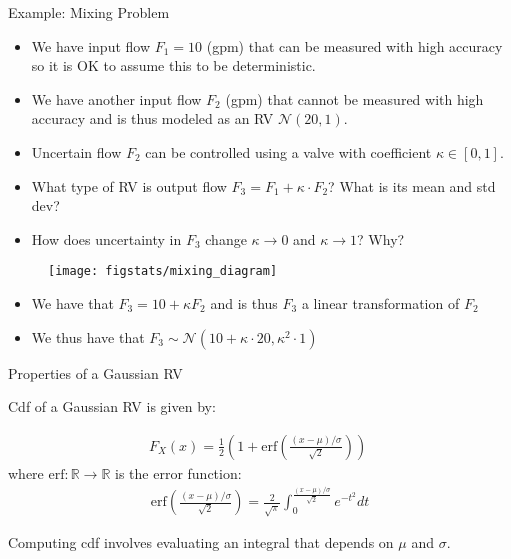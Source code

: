 \documentclass[handout,9pt]{beamer}
\begin{document}
\begin{frame}{Example: Mixing Problem}
\begin{itemize}
\item We have input flow  $F_1=10$ (gpm) that can be measured with high accuracy so it is OK to assume this to be deterministic. 
\item We have another input flow $F_2$ (gpm) that cannot be measured with high accuracy and is thus modeled as an RV $\mathcal{N}(20,1)$. 
\item Uncertain flow $F_2$ can be controlled using a valve with coefficient $\kappa \in [0,1]$. 
\end{itemize}
\begin{block}{}
\begin{itemize}
\item What type of RV is output flow $F_3=F_1+\kappa\cdot F_2$? What is its mean and std dev?
\item How does uncertainty in $F_3$ change $\kappa\to 0$ and $\kappa\to 1$? Why?
\end{itemize}
\end{block}
\begin{figure}[!htb]
    \centering
	\texttt{[image: figstats/mixing\_diagram]}
\end{figure}
\pause
\begin{itemize}
\item We have that $F_3=10+\kappa F_2$ and is thus $F_3$ a linear transformation of $F_2$
\item We thus have that $F_3\sim\mathcal{N}(10+\kappa\cdot 20,\kappa^2\cdot 1)$
\end{itemize}
\end{frame}


%
\begin{frame}{Properties of a Gaussian RV}

Cdf of a Gaussian RV is given by:
\begin{block}{}
\begin{align*}
F_X(x)=\frac{1}{2}\left(1+\textrm{erf}\left(\frac{(x-\mu)/\sigma}{\sqrt{2}}\right)\right)\; 
\end{align*}
where $\textrm{erf}:\mathbb{R}\to \mathbb{R}$ is the error function:
\begin{align*}
\textrm{erf}\left(\frac{(x-\mu)/\sigma}{\sqrt{2}}\right)=\frac{2}{\sqrt{\pi}}\int_0^{\frac{(x-\mu)/\sigma}{\sqrt{2}}}e^{-t^2}dt
\end{align*}
\end{block}
Computing cdf involves evaluating an integral that depends on $\mu$ and $\sigma$. 

\end{frame}
\end{document}
